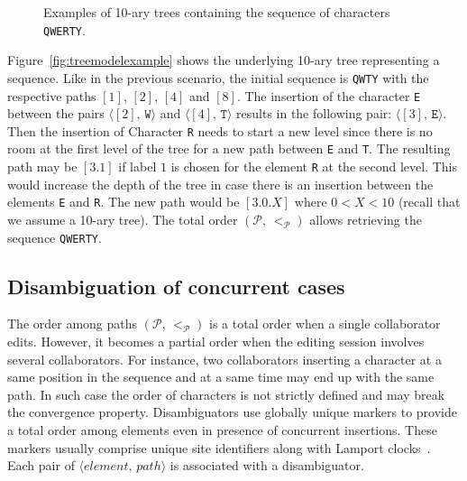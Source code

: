 \begin{figure*}
  \centering
  \hspace{20pt}
  \caption{Examples of 10-ary trees containing the sequence of characters
    \texttt{QWERTY}.}
\end{figure*}


Figure~\ref{fig:treemodelexample} shows the underlying 10-ary tree representing
a sequence. Like in the previous scenario, the initial sequence is \texttt{QWTY}
with the respective paths $[1]$, $[2]$, $[4]$ and $[8]$. The insertion of the
character \texttt{E} between the pairs $\langle [2],\, \texttt{W}\rangle$ and
$\langle [4],\, \texttt{T}\rangle$ results in the following pair:
$\langle [3],\, \texttt{E} \rangle$. Then the insertion of Character \texttt{R}
needs to start a new level since there is no room at the first level of the tree
for a new path between \texttt{E} and \texttt{T}. The resulting path may be
$[3.1]$ if label $1$ is chosen for the element \texttt{R} at the second
level. This would increase the depth of the tree in case there is an insertion
between the elements \texttt{E} and \texttt{R}. The new path would be $[3.0.X]$
where $0<X<10$ (recall that we assume a 10-ary tree). The total order
$(\mathcal{P},\,<_\mathcal{P})$ allows retrieving the sequence \texttt{QWERTY}.

\subsection{Disambiguation of concurrent cases}
\label{subsec:disambiguation}

The order among paths $(\mathcal{P},\,<_\mathcal{P})$ is a total order when a
single collaborator edits. However, it becomes a partial order when the editing
session involves several collaborators. For instance, two collaborators
inserting a character at a same position in the sequence and at a same time may
end up with the same path. In such case the order of characters is not strictly
defined and may break the convergence property. Disambiguators use globally
unique markers to provide a total order among elements even in presence of
concurrent insertions. These markers usually comprise unique site identifiers
along with Lamport clocks~\cite{lamport1978time}. Each pair of
$\langle element,\,path\rangle$ is associated with a disambiguator.

